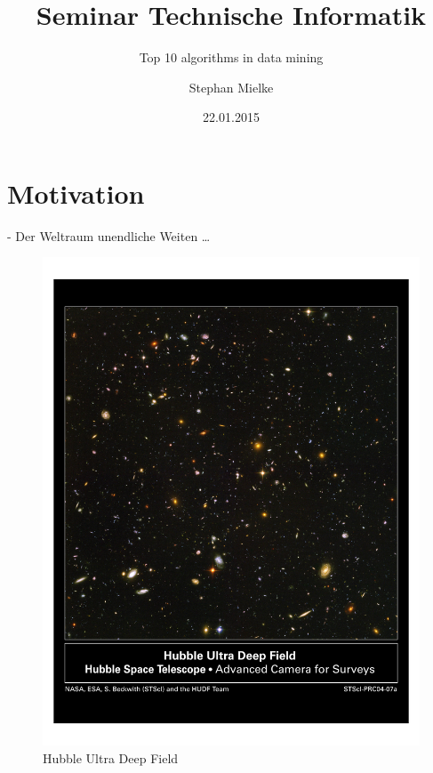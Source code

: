 \documentclass[fleqn,11pt,aspectratio=43]{beamer}
\title{Seminar Technische Informatik}
\subtitle{Top 10 algorithms in data mining}
\author{Stephan Mielke}
\date{22.01.2015}
\begin{document}
\begin{frame}
\titlepage
\end{frame}


\section*{Motivation~}

\begin{frame}[plain]{\insertsectionhead - Der Weltraum unendliche Weiten \dots}

\begin{figure}
\includegraphics[scale=0.6,trim={40 400 40 80},clip]{hs-2004-07-a-pdf}
\caption{Hubble Ultra Deep Field \cite{HUDF}}
\label{fig:hs-2004-07-a-pdf}
\end{figure}
\end{frame}
\end{document}
